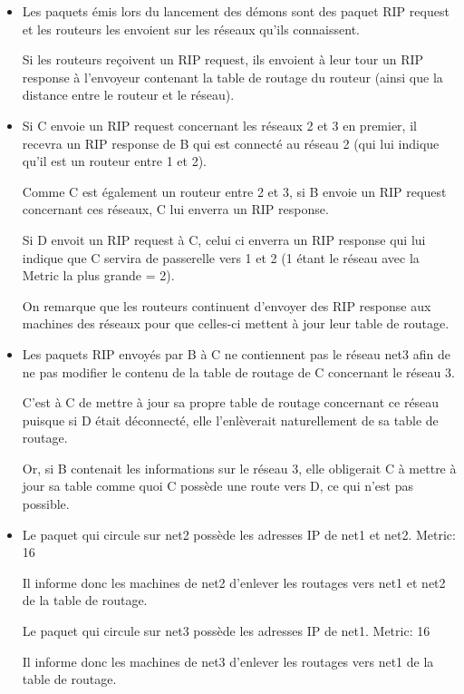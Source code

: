 \documentclass{article}
\begin{document}
\begin{itemize}\renewcommand{\labelitemi}{$\bullet$}
\item Les paquets émis lors du lancement des démons sont des paquet RIP request et les routeurs les envoient sur les réseaux qu'ils connaissent.

Si les routeurs reçoivent un RIP request, ils envoient à leur tour un RIP response à l'envoyeur contenant la table de routage du routeur (ainsi que la distance entre le routeur et le réseau).

\item Si C envoie un RIP request concernant les réseaux 2 et 3 en premier, il recevra un RIP response de B qui est connecté au réseau 2 (qui lui indique qu'il est un routeur entre 1 et 2).

Comme C est également un routeur entre 2 et 3, si B envoie un RIP request concernant ces réseaux, C lui enverra un RIP response.

Si D envoit un RIP request à C, celui ci enverra un RIP response qui lui indique que C servira de passerelle vers 1 et 2 (1 étant le réseau avec la Metric la plus grande = 2).

On remarque que les routeurs continuent d'envoyer des RIP response aux machines des réseaux pour que celles-ci mettent à jour leur table de routage.

\item Les paquets RIP envoyés par B à C ne contiennent pas le réseau net3 afin de ne pas modifier le contenu de la table de routage de C concernant le réseau 3.

C'est à C de mettre à jour sa propre table de routage concernant ce réseau puisque si D était déconnecté, elle l'enlèverait naturellement de sa table de routage.

Or, si B contenait les informations sur le réseau 3, elle obligerait C à mettre à jour sa table comme quoi C possède une route vers D, ce qui n'est pas possible.

\item Le paquet qui circule sur net2 possède les adresses IP de net1 et net2. Metric: 16

Il informe donc les machines de net2 d'enlever les routages vers net1 et net2 de la table de routage.

Le paquet qui circule sur net3 possède les adresses IP de net1. Metric: 16

Il informe donc les machines de net3 d'enlever les routages vers net1 de la table de routage.
\end{itemize}
\end{document}
